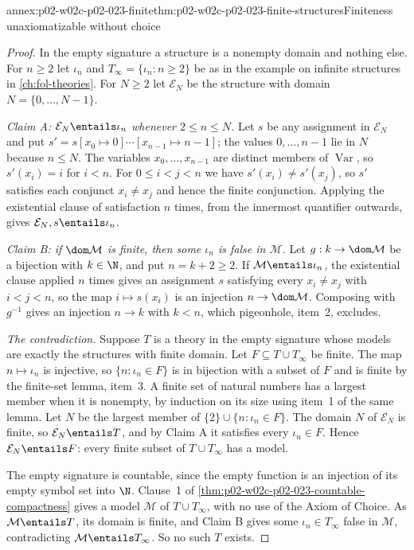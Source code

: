 \begin{annexitem}{annex:p02-w02c-p02-023-finite}{thm:p02-w02c-p02-023-finite-structures}{Finiteness unaxiomatizable without choice}
\begin{proof}
In the empty signature a structure is a nonempty domain and nothing else.
For \(n\geq2\) let \(\iota_n\) and \(T_\infty=\{\iota_n:n\geq2\}\) be as in
the example on infinite structures in \cref{ch:fol-theories}.  For
\(N\geq2\) let \(\mathcal E_N\) be the structure with domain
\(N=\{0,\ldots,N-1\}\).

\emph{Claim A: \(\mathcal E_N\entails\iota_n\) whenever
\(2\leq n\leq N\).}  Let \(s\) be any assignment in \(\mathcal E_N\) and put
\(s'=s[x_0\mapsto0]\cdots[x_{n-1}\mapsto n-1]\); the values \(0,\ldots,n-1\)
lie in \(N\) because \(n\leq N\).  The variables \(x_0,\ldots,x_{n-1}\) are
distinct members of \(\operatorname{Var}\), so \(s'(x_i)=i\) for \(i<n\).  For
\(0\leq i<j<n\) we have \(s'(x_i)\ne s'(x_j)\), so \(s'\) satisfies each
conjunct \(x_i\ne x_j\) and hence the finite conjunction.  Applying the
existential clause of satisfaction \(n\) times, from the innermost
quantifier outwards, gives \(\mathcal E_N,s\entails\iota_n\).

\emph{Claim B: if \(\dom\mathcal M\) is finite, then some \(\iota_n\) is false in
\(\mathcal M\).}  Let \(g:k\to\dom\mathcal M\) be a bijection with \(k\in\N\), and put
\(n=k+2\geq2\).  If \(\mathcal M\entails\iota_n\), the existential clause
applied \(n\) times gives an assignment \(s\) satisfying every
\(x_i\ne x_j\) with \(i<j<n\), so the map \(i\mapsto s(x_i)\) is an
injection \(n\to\dom\mathcal M\).  Composing with \(g^{-1}\) gives an injection
\(n\to k\) with \(k<n\), which pigeonhole, item~2, excludes.

\emph{The contradiction.}  Suppose \(T\) is a theory in the empty signature
whose models are exactly the structures with finite domain.  Let
\(F\subseteq T\cup T_\infty\) be finite.  The map \(n\mapsto\iota_n\) is
injective, so \(\{n:\iota_n\in F\}\) is in bijection with a subset of \(F\)
and is finite by the finite-set lemma, item~3.  A finite set of natural
numbers has a largest member when it is nonempty, by induction on its size
using item~1 of the same lemma.  Let \(N\) be the largest member of
\(\{2\}\cup\{n:\iota_n\in F\}\).  The domain \(N\) of \(\mathcal E_N\) is
finite, so \(\mathcal E_N\entails T\), and by Claim A it satisfies every
\(\iota_n\in F\).  Hence \(\mathcal E_N\entails F\): every finite subset of
\(T\cup T_\infty\) has a model.

The empty signature is countable, since the empty function is an injection
of its empty symbol set into \(\N\).  Clause~1 of
\cref{thm:p02-w02c-p02-023-countable-compactness} gives a model \(\mathcal M\)
of \(T\cup T_\infty\), with no use of the Axiom of Choice.  As
\(\mathcal M\entails T\), its domain is finite, and Claim B gives some
\(\iota_n\in T_\infty\) false in \(\mathcal M\), contradicting
\(\mathcal M\entails T_\infty\).  So no such \(T\) exists.
\end{proof}
\end{annexitem}

